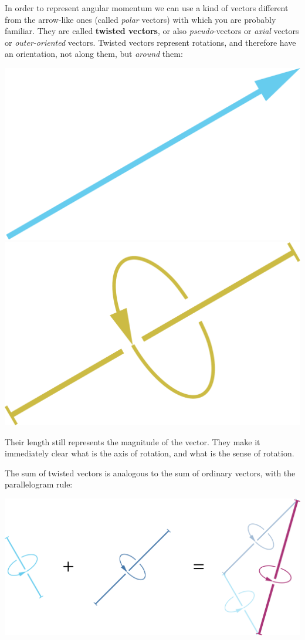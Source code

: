 \documentclass[a4paper,12pt,%
onecolumn,oneside,titlepage,%
british%
]{memoir}
\renewcommand*{\|}[1][]{\nonscript\:#1\vert\nonscript\:\mathopen{}}
\begin{document}
In order to represent angular momentum we can use a kind of vectors different from the arrow-like ones (called \emph{polar} vectors) with which you are probably familiar. They are called \textbf{twisted vectors}, or also \emph{pseudo}-vectors or \emph{axial} vectors or \emph{outer-oriented} vectors. Twisted vectors represent rotations, and therefore have an orientation, not along them, but \emph{around} them:
\begin{center}
\includegraphics[width=0.34\linewidth]{images/io-vector.pdf}%
\hspace*{0.12\linewidth}\includegraphics[width=0.34\linewidth]{images/oo-vector.pdf}%
%
\\\footnotesize
{}\hspace*{0.46\linewidth}
\end{center}
Their length still represents the magnitude of the vector. They make it immediately clear what is the axis of rotation, and what is the sense of rotation.

The sum of twisted vectors is analogous to the sum of ordinary vectors, with the parallelogram rule:
\begin{center}
\includegraphics[width=0.67\linewidth]{images/tvectorsum.pdf}%
\end{center}
\end{document}
